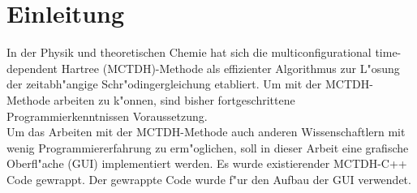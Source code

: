 \chapter{Einleitung}

In der Physik und theoretischen Chemie hat sich die multiconfigurational time-dependent Hartree (MCTDH)-Methode
als effizienter Algorithmus zur L"osung der zeitabh"angige Schr"odingergleichung etabliert.
Um mit der MCTDH-Methode arbeiten zu k"onnen, sind bisher fortgeschrittene Programmierkenntnissen Voraussetzung.\\
Um das Arbeiten mit der MCTDH-Methode auch anderen Wissenschaftlern mit wenig Programmiererfahrung zu erm"oglichen,
soll in dieser Arbeit eine grafische Oberfl"ache (GUI) implementiert werden.
Es wurde existierender MCTDH-C++ Code gewrappt. Der gewrappte Code wurde f"ur den Aufbau der GUI verwendet.
